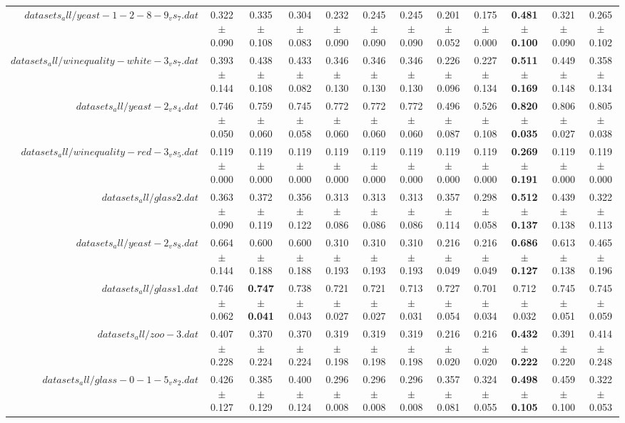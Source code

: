 \begin{table}[!ht]
{\begin{tabular}{r c c c c c c c c c c c}
$datasets_all/yeast-1-2-8-9_vs_7.dat$ & 0.322 $\pm$ 0.090 & 0.335 $\pm$ 0.108 & 0.304 $\pm$ 0.083 & 0.232 $\pm$ 0.090 & 0.245 $\pm$ 0.090 & 0.245 $\pm$ 0.090 & 0.201 $\pm$ 0.052 & 0.175 $\pm$ 0.000 & \textbf{0.481 $\pm$ 0.100} & 0.321 $\pm$ 0.090 & 0.265 $\pm$ 0.102 \\
$datasets_all/winequality-white-3_vs_7.dat$ & 0.393 $\pm$ 0.144 & 0.438 $\pm$ 0.108 & 0.433 $\pm$ 0.082 & 0.346 $\pm$ 0.130 & 0.346 $\pm$ 0.130 & 0.346 $\pm$ 0.130 & 0.226 $\pm$ 0.096 & 0.227 $\pm$ 0.134 & \textbf{0.511 $\pm$ 0.169} & 0.449 $\pm$ 0.148 & 0.358 $\pm$ 0.134 \\
$datasets_all/yeast-2_vs_4.dat$ & 0.746 $\pm$ 0.050 & 0.759 $\pm$ 0.060 & 0.745 $\pm$ 0.058 & 0.772 $\pm$ 0.060 & 0.772 $\pm$ 0.060 & 0.772 $\pm$ 0.060 & 0.496 $\pm$ 0.087 & 0.526 $\pm$ 0.108 & \textbf{0.820 $\pm$ 0.035} & 0.806 $\pm$ 0.027 & 0.805 $\pm$ 0.038 \\
$datasets_all/winequality-red-3_vs_5.dat$ & 0.119 $\pm$ 0.000 & 0.119 $\pm$ 0.000 & 0.119 $\pm$ 0.000 & 0.119 $\pm$ 0.000 & 0.119 $\pm$ 0.000 & 0.119 $\pm$ 0.000 & 0.119 $\pm$ 0.000 & 0.119 $\pm$ 0.000 & \textbf{0.269 $\pm$ 0.191} & 0.119 $\pm$ 0.000 & 0.119 $\pm$ 0.000 \\
$datasets_all/glass2.dat$ & 0.363 $\pm$ 0.090 & 0.372 $\pm$ 0.119 & 0.356 $\pm$ 0.122 & 0.313 $\pm$ 0.086 & 0.313 $\pm$ 0.086 & 0.313 $\pm$ 0.086 & 0.357 $\pm$ 0.114 & 0.298 $\pm$ 0.058 & \textbf{0.512 $\pm$ 0.137} & 0.439 $\pm$ 0.138 & 0.322 $\pm$ 0.113 \\
$datasets_all/yeast-2_vs_8.dat$ & 0.664 $\pm$ 0.144 & 0.600 $\pm$ 0.188 & 0.600 $\pm$ 0.188 & 0.310 $\pm$ 0.193 & 0.310 $\pm$ 0.193 & 0.310 $\pm$ 0.193 & 0.216 $\pm$ 0.049 & 0.216 $\pm$ 0.049 & \textbf{0.686 $\pm$ 0.127} & 0.613 $\pm$ 0.138 & 0.465 $\pm$ 0.196 \\
$datasets_all/glass1.dat$ & 0.746 $\pm$ 0.062 & \textbf{0.747 $\pm$ 0.041} & 0.738 $\pm$ 0.043 & 0.721 $\pm$ 0.027 & 0.721 $\pm$ 0.027 & 0.713 $\pm$ 0.031 & 0.727 $\pm$ 0.054 & 0.701 $\pm$ 0.034 & 0.712 $\pm$ 0.032 & 0.745 $\pm$ 0.051 & 0.745 $\pm$ 0.059 \\
$datasets_all/zoo-3.dat$ & 0.407 $\pm$ 0.228 & 0.370 $\pm$ 0.224 & 0.370 $\pm$ 0.224 & 0.319 $\pm$ 0.198 & 0.319 $\pm$ 0.198 & 0.319 $\pm$ 0.198 & 0.216 $\pm$ 0.020 & 0.216 $\pm$ 0.020 & \textbf{0.432 $\pm$ 0.222} & 0.391 $\pm$ 0.220 & 0.414 $\pm$ 0.248 \\
$datasets_all/glass-0-1-5_vs_2.dat$ & 0.426 $\pm$ 0.127 & 0.385 $\pm$ 0.129 & 0.400 $\pm$ 0.124 & 0.296 $\pm$ 0.008 & 0.296 $\pm$ 0.008 & 0.296 $\pm$ 0.008 & 0.357 $\pm$ 0.081 & 0.324 $\pm$ 0.055 & \textbf{0.498 $\pm$ 0.105} & 0.459 $\pm$ 0.100 & 0.322 $\pm$ 0.053 \\

\end{tabular}}
\end{table}
